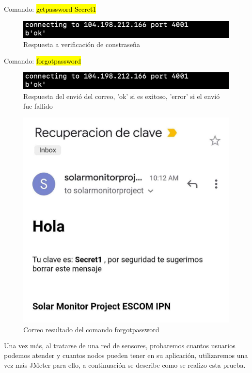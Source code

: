 Comando: \hl{getpassword Secret1}
\begin{figure}[H]
	\centering
	\includegraphics[scale=.5]{Capitulo5/images/forgot_pass.png}
	\caption{Respuesta a verificación de constraseña}
	\label{fig:}
\end{figure} 

Comando: \hl{forgotpassword}
\begin{figure}[H]
	\centering
	\includegraphics[scale=.5]{Capitulo5/images/forgot_pass.png}
	\caption{Respuesta del envió del correo, 'ok' si es exitoso, 'error' si el envió fue fallido}
	\label{fig:}
\end{figure} 

\begin{figure}[H]
	\centering
	\includegraphics[scale=.2]{Capitulo5/images/correo.jpg}
	\caption{Correo resultado del comando forgotpassword}
	\label{fig:}
\end{figure}

Una vez más, al tratarse de una red de sensores, probaremos cuantos usuarios podemos atender y cuantos nodos pueden tener en su aplicación, utilizaremos una vez más JMeter \citep{JMeter} para ello, a continuación se describe como se realizo esta prueba.

